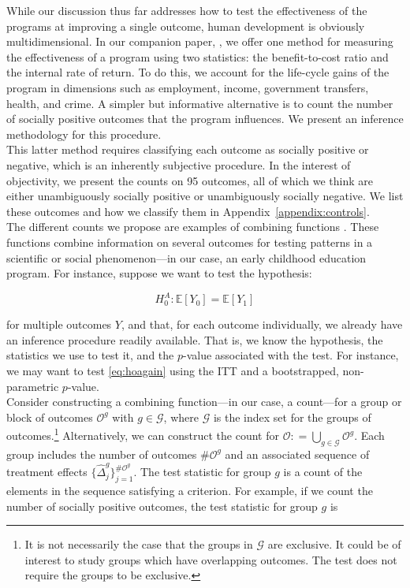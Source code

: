 \noindent While our discussion thus far addresses how to test the effectiveness of the programs at improving a single outcome, human development is obviously multidimensional. In our companion paper, \citet{Elango_et_al_2015_ABC_unpublished}, we offer one method for measuring the effectiveness of a program using two statistics: the benefit-to-cost ratio and the internal rate of return. To do this, we account for the life-cycle gains of the program in dimensions such as employment, income, government transfers, health, and crime. A simpler but informative alternative is to count the number of socially positive outcomes that the program influences. We present an inference methodology for this procedure.\\

\noindent This latter method requires classifying each outcome as socially positive or negative, which is an inherently subjective procedure. In the interest of objectivity, we present the counts on 95 outcomes, all of which we think are either unambiguously socially positive or unambiguously socially negative. We list these outcomes and how we classify them in Appendix~\ref{appendix:controls}.\\

\noindent The different counts we propose are examples of combining functions \citep[see][]{Pesarin_Salmaso_2010_PermutationTests}. These functions combine information on several outcomes for testing patterns in a scientific or social phenomenon---in our case, an early childhood education program. For instance, suppose we want to test the hypothesis: 

\begin{equation}
H_{0}^A: \mathbb{E} \left[ Y_{0} \right] =  \mathbb{E} \left[ Y_{1} \right] \label{eq:hoagain}
\end{equation}

\noindent for multiple outcomes $Y$, and that, for each outcome individually, we already have an inference procedure readily available. That is, we know the hypothesis, the statistics we use to test it, and the $p$-value associated with the test. For instance, we may want to test \eqref{eq:hoagain} using the ITT and a bootstrapped, non-parametric $p$-value.\\

\noindent Consider constructing a combining function---in our case, a count---for a group or block of outcomes $\mathcal{O}^g$ with $g \in \mathcal{G}$, where $\mathcal{G}$ is the index set for the groups of outcomes.\footnote{It is not necessarily the case that the groups in $\mathcal{G}$ are exclusive. It could be of interest to study groups which have overlapping outcomes. The test does not require the groups to be exclusive.} Alternatively, we can construct the count for $\mathcal{O} : =  \bigcup \limits _{g \in \mathcal{G}} \mathcal{O}^g$. Each group includes the number of outcomes $\# \mathcal{O}^g$ and an associated sequence of treatment effects $\{ \widehat{\Delta}_{j}^{g} \}_{j = 1}^{\# \mathcal{O}^g}$. The test statistic for group $g$ is a count of the elements in the sequence satisfying a criterion. For example, if we count the number of socially positive outcomes, the test statistic for group $g$ is 

